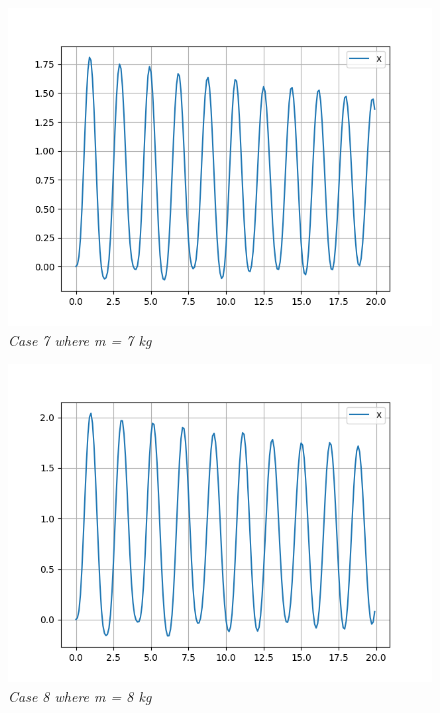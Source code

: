         \begin{figure}[H]
            \centering
            \includegraphics{Appendix/RExpPictures/R/rm7.png}
            \caption{\textit{Case 7 where m = 7 kg}}
            \label{}
        \end{figure}
            
        \begin{figure}[H]
            \centering
            \includegraphics{Appendix/RExpPictures/R/rm8.png}
            \caption{\textit{Case 8 where m = 8 kg}}
            \label{}
        \end{figure}
            
